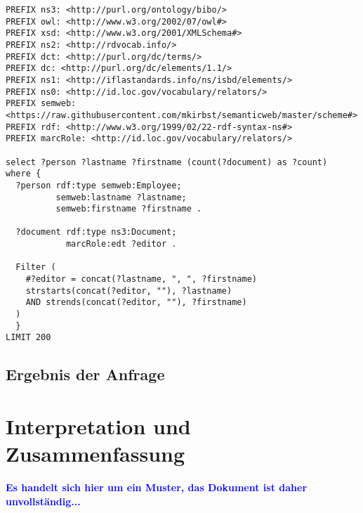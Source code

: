 \documentclass[parskip]{scrartcl}
\begin{document}
\begin{lstlisting}[captionpos=b, caption=SPARQL-Abfrage, label=SPARQL-Abfrage]
PREFIX ns3: <http://purl.org/ontology/bibo/>
PREFIX owl: <http://www.w3.org/2002/07/owl#>
PREFIX xsd: <http://www.w3.org/2001/XMLSchema#>
PREFIX ns2: <http://rdvocab.info/>
PREFIX dct: <http://purl.org/dc/terms/>
PREFIX dc: <http://purl.org/dc/elements/1.1/>
PREFIX ns1: <http://iflastandards.info/ns/isbd/elements/>
PREFIX ns0: <http://id.loc.gov/vocabulary/relators/>
PREFIX semweb: <https://raw.githubusercontent.com/mkirbst/semanticweb/master/scheme#>
PREFIX rdf: <http://www.w3.org/1999/02/22-rdf-syntax-ns#>
PREFIX marcRole: <http://id.loc.gov/vocabulary/relators/>

select ?person ?lastname ?firstname (count(?document) as ?count)
where {
  ?person rdf:type semweb:Employee;
          semweb:lastname ?lastname;
          semweb:firstname ?firstname .
  
  ?document rdf:type ns3:Document;
            marcRole:edt ?editor .
  
  Filter ( 
  	#?editor = concat(?lastname, ", ", ?firstname)
    strstarts(concat(?editor, ""), ?lastname)
    AND strends(concat(?editor, ""), ?firstname)
  )
  }
LIMIT 200
\end{lstlisting}




\subsection{Ergebnis der Anfrage}

\section{Interpretation und Zusammenfassung}

\textcolor{blue}{\textbf{Es handelt sich hier um ein Muster, das Dokument ist daher unvollständig...}}



\end{document}
